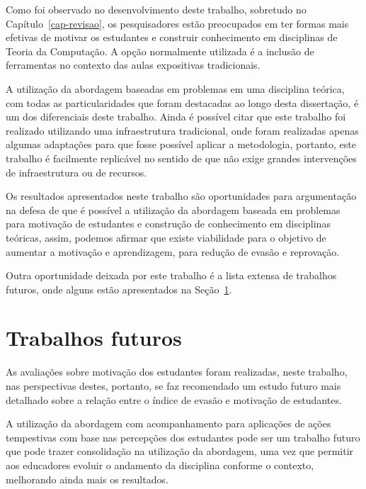 \label{sec-conclusao}
\acresetall
Como foi observado no desenvolvimento deste trabalho, sobretudo
no Capítulo~\ref{cap-revisao}, 
os pesquisadores estão preocupados em ter formas mais
efetivas de motivar os estudantes e construir conhecimento
em disciplinas de Teoria da Computação.
A opção normalmente utilizada é a inclusão de ferramentas
no contexto das aulas expositivas tradicionais.

A utilização da abordagem baseadas em problemas
em uma disciplina teórica, com todas as
particularidades que foram destacadas ao longo desta
dissertação, é um dos diferenciais deste trabalho.
Ainda é possível citar que este trabalho foi realizado
utilizando uma infraestrutura tradicional, onde foram
realizadas apenas algumas adaptações para que fosse
possível aplicar a metodologia, portanto, este
trabalho é facilmente replicável no sentido de que não exige
grandes intervenções de infraestrutura ou de recursos.

Os resultados apresentados neste trabalho são oportunidades
para argumentação na defesa de que é possível a utilização
da abordagem baseada em problemas para motivação de
estudantes e construção de conhecimento em disciplinas
teóricas, assim, podemos afirmar que existe viabilidade para
o objetivo de aumentar a motivação e aprendizagem, para redução
de evasão e reprovação.

Outra oportunidade deixada por este trabalho é
a lista extensa de trabalhos futuros, onde alguns estão
apresentados na Seção~\ref{sec-trab-futuros}.

\section{Trabalhos futuros}
\label{sec-trab-futuros}
As avaliações sobre motivação dos estudantes
foram realizadas, neste trabalho, nas perspectivas
destes, portanto, se faz recomendado um estudo futuro
mais detalhado sobre a relação entre o índice
de evasão e motivação de estudantes.

A utilização da abordagem com acompanhamento
para aplicações de ações tempestivas com base nas
percepções dos estudantes pode ser um trabalho futuro
que pode trazer consolidação na utilização da
abordagem, uma vez que permitir aos educadores evoluir
o andamento da disciplina conforme o contexto,
melhorando ainda mais os resultados.

